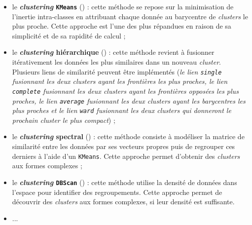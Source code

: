 		\begin{itemize}
			\item le \textbf{\textit{clustering} \texttt{KMeans}} (\cite{macqueen:1967:methods-classification-analysis}) :
			cette méthode se repose sur la minimisation de l'inertie intra-classes en attribuant chaque donnée au barycentre de \textit{clusters} le plus proche.
			Cette approche est l'une des plus répandues en raison de sa simplicité et de sa rapidité de calcul ;
			\item le \textbf{\textit{clustering} hiérarchique} (\cite{murtagh-contreras:2012:algorithms-hierarchical-clustering}) :
			cette méthode revient à fusionner itérativement les données les plus similaires dans un nouveau \textit{cluster}.
			Plusieurs liens de similarité peuvent être implémentés (\textit{le lien \texttt{single} fusionnant les deux \textit{clusters} ayant les frontières les plus proches, le lien \texttt{complete} fusionnant les deux \textit{clusters} ayant les frontières opposées les plus proches, le lien \texttt{average} fusionnant les deux \textit{clusters} ayant les barycentres les plus proches et le lien \texttt{ward} fusionnant les deux \textit{clusters} qui donneront le prochain \textit{cluster} le plus compact}) ;
			\item le \textbf{\textit{clustering} spectral} (\cite{ng-etal:2002:spectral-clustering-analysis}) :
			cette méthode consiste à modéliser la matrice de similarité entre les données par ses vecteurs propres puis de regrouper ces derniers à l'aide d'un \texttt{KMeans}.
			Cette approche permet d'obtenir des \textit{clusters} aux formes complexes ;
			\item le \textbf{\textit{clustering} \texttt{DBScan}} (\cite{ester-etal:1996:densitybased-algorithm-discovering}) :
			cette méthode utilise la densité de données dans l'espace pour identifier des regroupements.
			Cette approche permet de découvrir des \textit{clusters} aux formes complexes, si leur densité est suffisante.
			\item ...
		\end{itemize}
		

